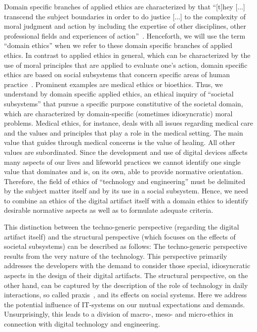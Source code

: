 \documentclass[manuscript,screen]{acmart}
\begin{document}
Domain specific branches of applied ethics are characterized by that ``[t]hey [...] transcend the subject boundaries in order to do justice [...] to the complexity of moral judgment and action by including the expertise of other disciplines, other professional fields and experiences of action''~\cite[p. 4; translated by the authors]{nida1998ethische}. Henceforth, we will use the term “domain ethics” when we refer to these domain specific branches of applied ethics. In contrast to applied ethics in general, which can be characterized by the use of moral principles that are applied to evaluate one’s action, domain specific ethics are based on social subsystems that concern specific areas of human practice~\cite[p.63]{nida2005menschliche}. Prominent examples are medical ethics or bioethics. Thus, we understand by domain specific applied ethics, an ethical inquiry of ``societal subsystems'' that pursue a specific purpose constitutive of the societal domain, which are characterized by domain-specific (sometimes idiosyncratic) moral problems. Medical ethics, for instance, deals with all issues regarding medical care and the values and principles that play a role in the medical setting. The main value that guides through medical concerns is the value of healing. All other values are subordinated. Since the development and use of digital devices affects many aspects of our lives and lifeworld practices we cannot identify one single value that dominates and is, on its own, able to provide normative orientation. Therefore, the field of ethics of ``technology and engineering'' must be delimited by the subject matter itself and by its use in a social subsystem. Hence, we need to combine an ethics of the digital artifact itself with a domain ethics to identify desirable normative aspects as well as to formulate adequate criteria. 

This distinction between the techno-generic perspective (regarding the digital artifact itself) and the structural perspective (which focuses on the effects of societal subsystems) can be described as follows: The techno-generic perspective results from the very nature of the technology. This perspective primarily addresses the developers with the demand to consider those special, idiosyncratic aspects in the design of their digital artifacts. The structural perspective, on the other hand, can be captured by the description of the role of technology in daily interactions, so called praxis~\cite{macintyre2013after,nida2019structural,knauff2021handbook}, and its effects on social systems. Here we address the potential influence of IT-systems on our mutual expectations and demands. Unsurprisingly, this leads to a division of macro-, meso- and micro-ethics in connection with digital technology and engineering.
\end{document}
